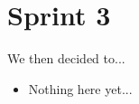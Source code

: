 \chapter{Sprint 3}
We then decided to...
\begin{itemize}
 \item Nothing here yet... 
\end{itemize}




